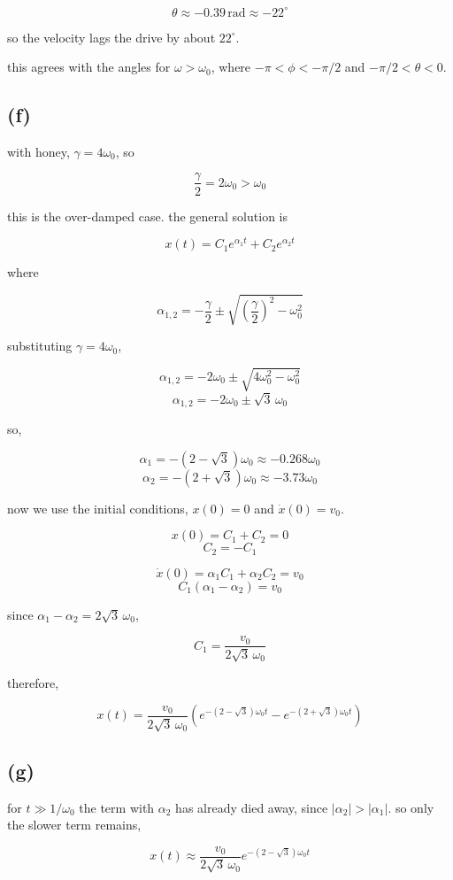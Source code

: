 \documentclass{article}
\begin{document}
\[
\boxed{\theta\approx-0.39\,\mathrm{rad}\approx-22^\circ}
\]

so the velocity lags the drive by about $22^\circ$.

this agrees with the angles for $\omega>\omega_0$, where $-\pi<\phi<-\pi/2$ and $-\pi/2<\theta<0$.

\subsection*{(f)}

with honey, $\gamma=4\omega_0$, so

\[
\frac{\gamma}{2}=2\omega_0>\omega_0
\]

this is the over-damped case. the general solution is

\[
x(t)=C_1e^{\alpha_1t}+C_2e^{\alpha_2t}
\]

where

\[
\alpha_{1,2}=-\frac{\gamma}{2}\pm\sqrt{\left(\frac{\gamma}{2}\right)^2-\omega_0^2}
\]

substituting $\gamma=4\omega_0$,

\[
\alpha_{1,2}=-2\omega_0\pm\sqrt{4\omega_0^2-\omega_0^2}
\]
\[
\alpha_{1,2}=-2\omega_0\pm\sqrt{3}\,\omega_0
\]

so,

\[
\alpha_1=-(2-\sqrt{3})\omega_0\approx-0.268\omega_0
\]
\[
\alpha_2=-(2+\sqrt{3})\omega_0\approx-3.73\omega_0
\]

now we use the initial conditions, $x(0)=0$ and $\dot{x}(0)=v_0$.

\[
x(0)=C_1+C_2=0
\]
\[
C_2=-C_1
\]

\[
\dot{x}(0)=\alpha_1C_1+\alpha_2C_2=v_0
\]
\[
C_1(\alpha_1-\alpha_2)=v_0
\]

since $\alpha_1-\alpha_2=2\sqrt{3}\,\omega_0$,

\[
C_1=\frac{v_0}{2\sqrt{3}\,\omega_0}
\]

therefore,

\[
\boxed{x(t)=\frac{v_0}{2\sqrt{3}\,\omega_0}\left(e^{-(2-\sqrt{3})\omega_0t}-e^{-(2+\sqrt{3})\omega_0t}\right)}
\]

\subsection*{(g)}

for $t\gg1/\omega_0$ the term with $\alpha_2$ has already died away, since $|\alpha_2|>|\alpha_1|$. so only the slower term remains,

\[
x(t)\approx\frac{v_0}{2\sqrt{3}\,\omega_0}e^{-(2-\sqrt{3})\omega_0t}
\]
\end{document}

